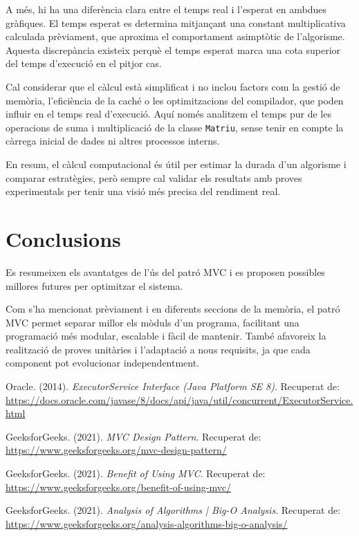 \documentclass{ieeetj}
\begin{document}
A més, hi ha una diferència clara entre el temps real i l’esperat en ambdues gràfiques. El temps esperat es determina mitjançant una constant multiplicativa calculada prèviament, que aproxima el comportament asimptòtic de l’algorisme. Aquesta discrepància existeix perquè el temps esperat marca una cota superior del temps d’execució en el pitjor cas.

Cal considerar que el càlcul està simplificat i no inclou factors com la gestió de memòria, l’eficiència de la caché o les optimitzacions del compilador, que poden influir en el temps real d’execució. Aquí només analitzem el temps pur de les operacions de suma i multiplicació de la classe \texttt{Matriu}, sense tenir en compte la càrrega inicial de dades ni altres processos interns.

En resum, el càlcul computacional és útil per estimar la durada d’un algorisme i comparar estratègies, però sempre cal validar els resultats amb proves experimentals per tenir una visió més precisa del rendiment real.

\section{Conclusions}
Es resumeixen els avantatges de l'ús del patró MVC i es proposen possibles millores futures per optimitzar el sistema.

Com s'ha mencionat prèviament i en diferents seccions de la memòria, el patró MVC permet separar millor els mòduls d'un programa, facilitant una programació més modular, escalable i fàcil de mantenir. També afavoreix la realització de proves unitàries i l’adaptació a nous requisits, ja que cada component pot evolucionar independentment.

\begin{thebibliography}{9}

Oracle. (2014). \textit{ExecutorService Interface (Java Platform SE 8)}. Recuperat de: \url{https://docs.oracle.com/javase/8/docs/api/java/util/concurrent/ExecutorService.html}

GeeksforGeeks. (2021). \textit{MVC Design Pattern}. Recuperat de: \url{https://www.geeksforgeeks.org/mvc-design-pattern/}

GeeksforGeeks. (2021). \textit{Benefit of Using MVC}. Recuperat de: \url{https://www.geeksforgeeks.org/benefit-of-using-mvc/}

GeeksforGeeks. (2021). \textit{Analysis of Algorithms | Big-O Analysis}. Recuperat de: \url{https://www.geeksforgeeks.org/analysis-algorithms-big-o-analysis/}

\end{thebibliography}
\end{document}
